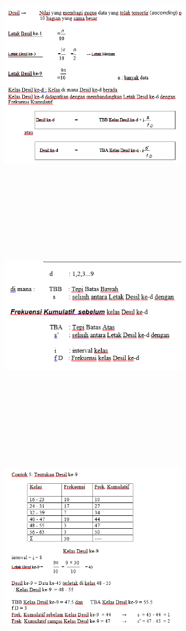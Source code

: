 \documentclass[11pt,fleqn]{book} %
\begin{document}
{\includegraphics[width = 8cm, height= 10cm]{Pictures/rizkie20.png}

\includegraphics[width = 8cm, height= 10cm]{Pictures/rizkie21.png}

\includegraphics[width =8cm, height= 10cm]{Pictures/rizkie22.png}

}
\end{document}
